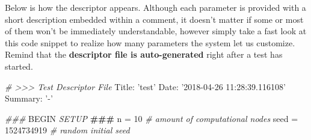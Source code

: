 \documentclass[11pt]{article}
\newenvironment{Shaded}{}{}
\newcommand{\DecValTok}[1]{\textcolor[rgb]{0.25,0.63,0.44}{{#1}}}
\newcommand{\StringTok}[1]{\textcolor[rgb]{0.25,0.44,0.63}{{#1}}}
\newcommand{\CommentTok}[1]{\textcolor[rgb]{0.38,0.63,0.69}{\textit{{#1}}}}
\newcommand{\AlertTok}[1]{\textcolor[rgb]{1.00,0.00,0.00}{\textbf{{#1}}}}
\newcommand{\RegionMarkerTok}[1]{{#1}}
\newcommand{\NormalTok}[1]{{#1}}
\newcommand{\OperatorTok}[1]{\textcolor[rgb]{0.40,0.40,0.40}{{#1}}}
\begin{document}
Below is how the descriptor appears. Although each parameter is provided
with a short description embedded within a comment, it doesn't matter if
some or most of them won't be immediately understandable, however simply
take a fast look at this code snippet to realize how many parameters the
system let us customize. Remind that the \textbf{descriptor file is
auto-generated} right after a test has started.

\begin{Shaded}
\begin{Highlighting}[]
\CommentTok{# >>> Test Descriptor File}
\NormalTok{Title: }\StringTok{'test'}
\NormalTok{Date: }\StringTok{'2018-04-26 11:28:39.116108'}
\NormalTok{Summary: }\StringTok{'-'}

\CommentTok{### }\RegionMarkerTok{BEGIN}\CommentTok{ SETUP }\AlertTok{###}
\NormalTok{n }\OperatorTok{=} \DecValTok{10}  \CommentTok{# amount of computational nodes}
\NormalTok{seed }\OperatorTok{=} \DecValTok{1524734919}  \CommentTok{# random initial seed}


\end{Highlighting}
\end{Shaded}
\end{document}

